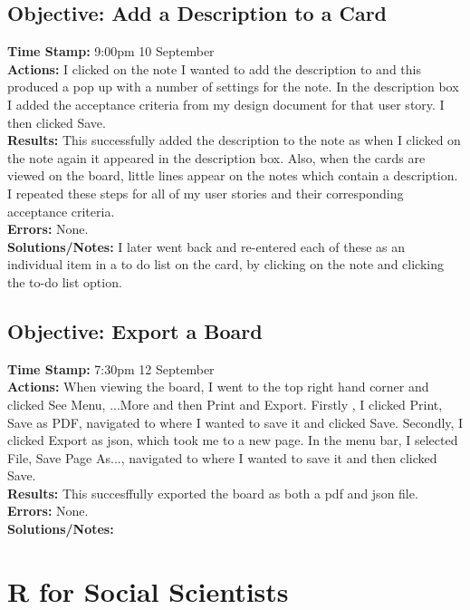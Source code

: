 \documentclass{article}
\begin{document}
\begin{FlushLeft}
\subsection{Objective: Add a Description to a Card}
\textbf{Time Stamp:} 9:00pm 10 September\\
\textbf{Actions:} I clicked on the note I wanted to add the description to and this produced a pop up with a number of settings for the note. In the description box I added the acceptance criteria from my design document for that user story. I then clicked Save.\\
\textbf{Results:} This successfully added the description to the note as when I clicked on the note again it appeared in the description box. Also, when the cards are viewed on the board, little lines appear on the notes which contain a description. I repeated these steps for all of my user stories and their corresponding acceptance criteria.\\
\textbf{Errors:} None.\\
\textbf{Solutions/Notes:} I later went back and re-entered each of these as an individual item in a to do list on the card, by clicking on the note and clicking the to-do list option.\\

\subsection{Objective: Export a Board}
\textbf{Time Stamp:} 7:30pm 12 September\\
\textbf{Actions:} When viewing the board, I went to the top right hand corner and clicked See Menu, ...More and then Print and Export. Firstly , I clicked Print, Save as PDF, navigated to where I wanted to save it and clicked Save. Secondly, I clicked Export as json, which took me to a new page. In the menu bar, I selected File, Save Page As..., navigated to where I wanted to save it and then clicked Save.\\
\textbf{Results:} This succesffully exported the board as both a pdf and json file. \\
\textbf{Errors:} None.\\
\textbf{Solutions/Notes:}\\

\pagebreak

\section{R for Social Scientists}

\end{FlushLeft}
\end{document}
